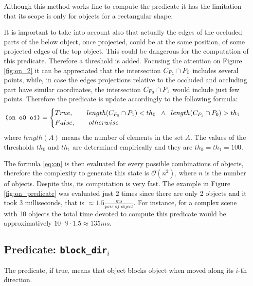 Although this method works fine to compute the  predicate it has the limitation that its scope is only for objects for a rectangular shape.

It is important to take into account also that actually the edges of the occluded parts of the below object, once projected, could be at the same position, of some projected edges of the top object. This could be dangerous for the computation of this predicate. Therefore a threshold is added. Focusing the attention on Figure \ref{fig:on_2} it can be appreciated that the intersection ${\sc C_{P_{1}}} \cap {\sc P_{0}}$ includes several points, while, in case the edges projections relative to the occluded and occluding part have similar coordinates, the intersection ${\sc C_{P_{0}}} \cap {\sc P_{1}}$ would include just few points. Therefore the  predicate is update accordingly to the following formula:
\begin{equation}
\texttt{(on o0 o1)} =
\begin{cases}
{\sc True}, \qquad length({\sc C_{P_{0}}} \cap {\sc P_{1}}) < th_0 \;\; \wedge \;\; length({\sc C_{P_{1}}} \cap {\sc P_{0}}) > th_1 \\
{\sc False}, \qquad otherwise
\end{cases}
\label{eq:on}
\end{equation}
where $length(A)$ means the number of elements in the set $A$.
The values of the thresholds $th_0$ and $th_1$ are determined empirically and they are $th_0=th_1=100$.

The formula \ref{eq:on} is then evaluated for every possible combinations of objects, therefore the complexity to generate this state is $\mathcal{O}(n^2)$, where $n$ is the number of objects. Despite this, its computation is very fast. The example in Figure \ref{fig:on_predicate} was evaluated just 2 times since there are only 2 objects and it took $3$ milliseconds, that is $\approx 1.5 \frac{ms}{pair \; of \; object}$. For instance, for a complex scene with 10 objects the total time devoted to compute this predicate would be approximatively $10 \cdot 9 \cdot 1.5 \approx 135 ms$.



\subsection{Predicate: \texttt{block\_dir$_i$}}
The  predicate, if true, means that object  blocks object  when moved along its $i$-th direction. 

